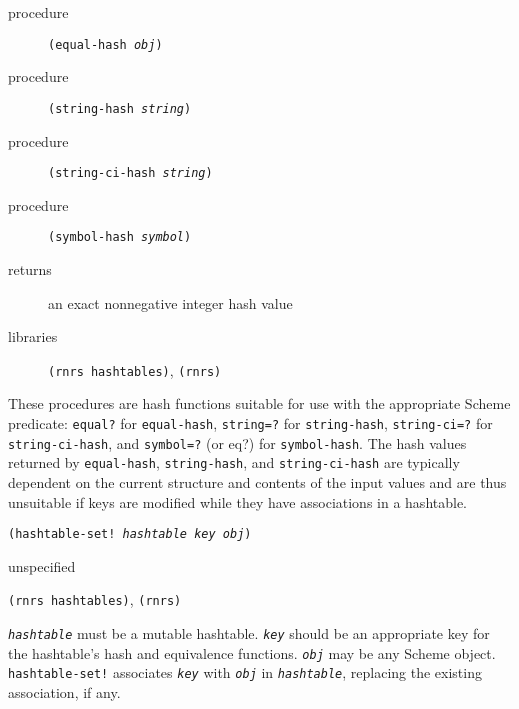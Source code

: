 \begin{description}

\label{objects_s279}\item[procedure] \texttt{(equal-hash \textit{obj})}



\item[procedure] \texttt{(string-hash \textit{string})}



\item[procedure] \texttt{(string-ci-hash \textit{string})}



\item[procedure] \texttt{(symbol-hash \textit{symbol})}



\item[returns] an exact nonnegative integer hash value


\item[libraries] \texttt{(rnrs hashtables)}, \texttt{(rnrs)}
\end{description}


These procedures are hash functions suitable for use with the appropriate
Scheme predicate: \texttt{equal?} for \texttt{equal-hash}, \texttt{string=?}
for \texttt{string-hash}, \texttt{string-ci=?} for \texttt{string-ci-hash},
and \texttt{symbol=?} (or eq?) for \texttt{symbol-hash}.
The hash values returned by \texttt{equal-hash}, \texttt{string-hash},
and \texttt{string-ci-hash} are typically dependent on the current structure
and contents of the input values and are thus unsuitable if keys
are modified while they have associations in a hashtable.


\begin{description}

\label{objects_s280}\item[procedure] \texttt{(hashtable-set! \textit{hashtable} \textit{key} \textit{obj})}



\item[returns] unspecified


\item[libraries] \texttt{(rnrs hashtables)}, \texttt{(rnrs)}
\end{description}

\texttt{\textit{hashtable}} must be a mutable hashtable.
\texttt{\textit{key}} should be an appropriate key for the hashtable's
hash and equivalence functions.
\texttt{\textit{obj}} may be any Scheme object.
\texttt{hashtable-set!} associates \texttt{\textit{key}}
with \texttt{\textit{obj}} in \texttt{\textit{hashtable}}, replacing the
existing association, if any.

